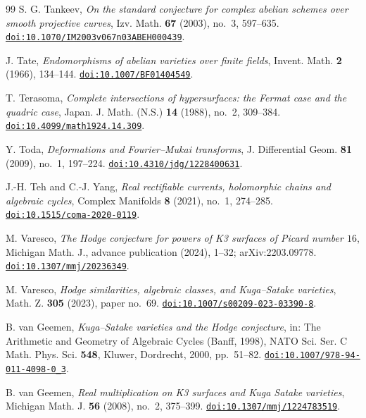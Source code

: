 \begin{thebibliography}{99}
S. G. Tankeev,
\emph{On the standard conjecture for complex abelian schemes over smooth
projective curves},
Izv. Math. \textbf{67} (2003), no.~3, 597--635.
\href{https://doi.org/10.1070/IM2003v067n03ABEH000439}{\texttt{doi:10.1070/IM2003v067n03ABEH000439}}.

J. Tate,
\emph{Endomorphisms of abelian varieties over finite fields},
Invent. Math. \textbf{2} (1966), 134--144.
\href{https://doi.org/10.1007/BF01404549}{\texttt{doi:10.1007/BF01404549}}.

T. Terasoma,
\emph{Complete intersections of hypersurfaces: the Fermat case and the
quadric case},
Japan. J. Math. (N.S.) \textbf{14} (1988), no.~2, 309--384.
\href{https://doi.org/10.4099/math1924.14.309}{\texttt{doi:10.4099/math1924.14.309}}.

Y. Toda,
\emph{Deformations and Fourier--Mukai transforms},
J. Differential Geom. \textbf{81} (2009), no.~1, 197--224.
\href{https://doi.org/10.4310/jdg/1228400631}{\texttt{doi:10.4310/jdg/1228400631}}.

J.-H. Teh and C.-J. Yang,
\emph{Real rectifiable currents, holomorphic chains and algebraic cycles},
Complex Manifolds \textbf{8} (2021), no.~1, 274--285.
\href{https://doi.org/10.1515/coma-2020-0119}{\texttt{doi:10.1515/coma-2020-0119}}.

M. Varesco,
\emph{The Hodge conjecture for powers of K3 surfaces of Picard number $16$},
Michigan Math. J., advance publication (2024), 1--32; arXiv:2203.09778.
\href{https://doi.org/10.1307/mmj/20236349}{\texttt{doi:10.1307/mmj/20236349}}.

M. Varesco,
\emph{Hodge similarities, algebraic classes, and Kuga--Satake varieties},
Math. Z. \textbf{305} (2023), paper no.~69.
\href{https://doi.org/10.1007/s00209-023-03390-8}{\texttt{doi:10.1007/s00209-023-03390-8}}.

B. van Geemen,
\emph{Kuga--Satake varieties and the Hodge conjecture},
in: The Arithmetic and Geometry of Algebraic Cycles (Banff, 1998),
NATO Sci. Ser. C Math. Phys. Sci. \textbf{548},
Kluwer, Dordrecht, 2000, pp.~51--82.
\href{https://doi.org/10.1007/978-94-011-4098-0_3}{\texttt{doi:10.1007/978-94-011-4098-0\_3}}.

B. van Geemen,
\emph{Real multiplication on K3 surfaces and Kuga Satake varieties},
Michigan Math. J. \textbf{56} (2008), no.~2, 375--399.
\href{https://doi.org/10.1307/mmj/1224783519}{\texttt{doi:10.1307/mmj/1224783519}}.


\end{thebibliography}
